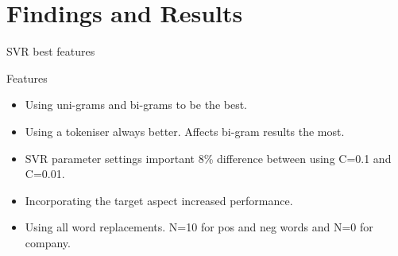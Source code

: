 \documentclass[10pt]{beamer}
\begin{document}
\section{Findings and Results}

\begin{frame}[fragile]{SVR best features}
\begin{block}{Features}
\begin{itemize}
\item Using uni-grams and bi-grams to be the best.
\item Using a tokeniser always better. Affects bi-gram results the most.
\item SVR parameter settings important 8\% difference between using C=0.1 and C=0.01. 
\item Incorporating the target aspect increased performance.
\item Using all word replacements. N=10 for pos and neg words and N=0 for company.
\end{itemize}
\end{block}

\end{frame}
\end{document}
